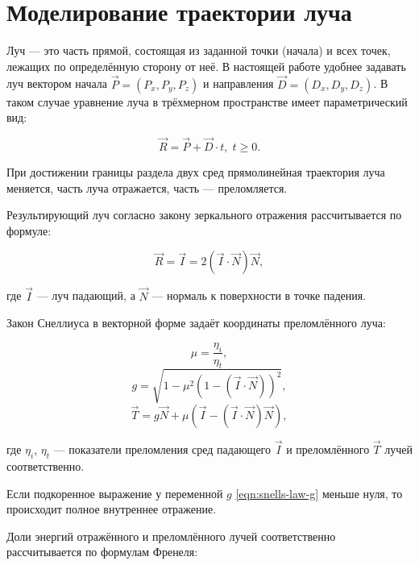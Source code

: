 \section{Моделирование траектории луча}

Луч — это часть прямой, состоящая из заданной точки (начала) и всех точек, лежащих по определённую сторону от неё.
В настоящей работе удобнее задавать луч вектором начала $\vec P = (P_x, P_y, P_z)$ и направления $\vec D = (D_x, D_y, D_z)$.
В таком случае уравнение луча в трёхмерном пространстве имеет параметрический вид:

\begin{equation}
	\vec R = \vec P + \vec D \cdot t, \; t \geqslant 0.
\end{equation}

При достижении границы раздела двух сред прямолинейная траектория луча меняется, часть луча отражается, часть — преломляется.

Результирующий луч согласно закону зеркального отражения рассчитывается по формуле:

\begin{equation}
	\label{eqn:reflection}
	\vec R = \vec I = 2\left(\vec I \cdot \vec N\right)\vec N,
\end{equation}

\noindent где $\vec I$ — луч падающий, а $\vec N$ — нормаль к поверхности в точке падения.

Закон Снеллиуса в векторной форме задаёт координаты преломлённого луча:

\begin{equation}
	\label{eqn:refraction-begin}
	\mu = \frac{\eta_i}{\eta_t},
\end{equation}
\begin{equation}
	\label{eqn:snells-law-g}
	g = \sqrt{1 - \mu^2\left(1 - \left(\vec I \cdot \vec N\right)\right)^2},
\end{equation}
\begin{equation}
	\vec T = g \vec N + \mu \left(\vec I - \left(\vec I \cdot \vec N\right) \vec N\right),
\end{equation}

\noindent где $\eta_i$, $\eta_t$ — показатели преломления сред падающего $\vec I$ и преломлённого $\vec T$ лучей соответственно.

Если подкоренное выражение у переменной $g$ \eqref{eqn:snells-law-g} меньше нуля, то происходит полное внутреннее отражение.

Доли энергий отражённого и преломлённого лучей соответственно рассчитывается по формулам Френеля:

